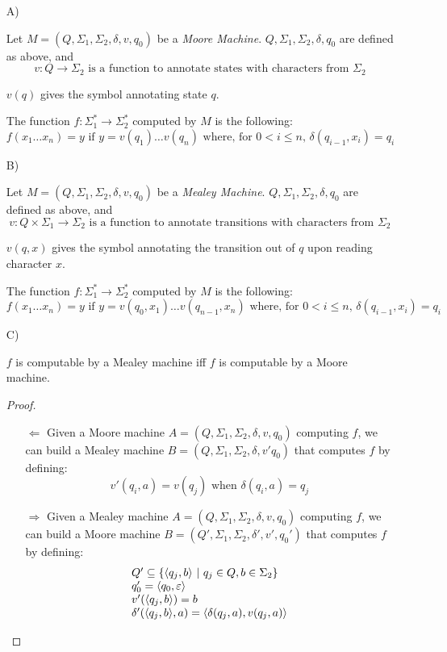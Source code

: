 \documentclass[11pt]{article}
\begin{document}
\begin{itemize}

\item[A)] 

Let $M = (Q, \Sigma_1, \Sigma_2, \delta, v, q_0)$ be a \emph{Moore Machine}. $Q, \Sigma_1, \Sigma_2, \delta, q_0$ are defined as above, and
$$v: Q \to \Sigma_2 \textrm{ is a function to annotate states with characters from } \Sigma_2$$

$v(q)$ gives the symbol annotating state $q$.

The function $f: \Sigma_1^* \to \Sigma_2^*$ computed by $M$ is the following:
$$ f(x_1 \ldots x_n) = y \textrm{ if } y = v(q_1) \ldots v(q_n) \textrm{ where, for $0<i\leq n$, } \delta(q_{i-1}, x_i) = q_i$$

\item[B)] 

Let $M = (Q, \Sigma_1, \Sigma_2, \delta, v, q_0)$ be a \emph{Mealey Machine}.  $Q, \Sigma_1, \Sigma_2, \delta, q_0$ are defined as above, and
$$v: Q \times \Sigma_1 \to \Sigma_2 \textrm{ is a function to annotate transitions with characters from } \Sigma_2$$

$v(q,x)$ gives the symbol annotating the transition out of $q$ upon reading character $x$.

The function $f: \Sigma_1^* \to \Sigma_2^*$ computed by $M$ is the following:
$$ f(x_1 \ldots x_n) = y \textrm{ if } y=v(q_0, x_1) \ldots v(q_{n-1}, x_n) \textrm{ where, for $0<i \leq n$, } \delta(q_{i-1}, x_i) = q_i$$


\item[C)] 

$f$ is computable by a Mealey machine iff $f$ is computable by a Moore machine.

\begin{proof}\hfill
\begin{itemize}

\item[$\Longleftarrow$] 
Given a Moore machine $A = (Q, \Sigma_1, \Sigma_2, \delta, v, q_0)$ computing $f$, we can build a Mealey machine $B = (Q, \Sigma_1, \Sigma_2, \delta, v' q_0)$ that computes $f$ by defining:
$$v'(q_i, a) = v(q_j) \textrm{ when } \delta(q_i, a) = q_j$$

\item[$\Longrightarrow$] 
Given a Mealey machine $A = (Q, \Sigma_1, \Sigma_2, \delta, v, q_0)$ computing $f$, we can build a Moore machine $B = (Q', \Sigma_1, \Sigma_2, \delta', v', q_0')$ that computes $f$ by defining:
$$\begin{array}{l}
Q' \subseteq \{ \langle q_j,b \rangle \ | \  q_j \in Q, b \in \Sigma_2 \} \\
q_0' = \langle q_0, \varepsilon \rangle \\
v'(\langle q_j,b \rangle) = b \\
\delta'(\langle q_j, b \rangle, a) = \langle \delta(q_j,a), v(q_j,a) \rangle
\end{array}$$

\end{itemize}
\end{proof}

\end{itemize}
\end{document}
